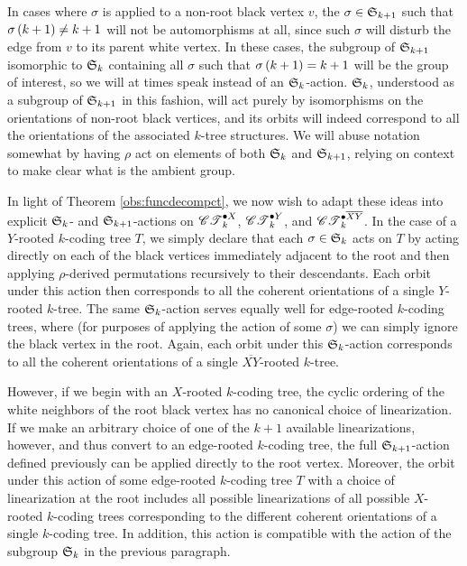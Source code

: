 \documentclass[sectionflow,singlespace,twoside,boldmathhdr,draft]{brandiss} %
\numberwithin{section}{chapter}
\numberwithin{figure}{chapter}
\begin{document}
In cases where $\sigma$ is applied to a non-root black vertex $v$, the $\sigma \in \symgp{k+1}$ such that $\sigma \pbrac{k+1} \neq k+1$ will not be automorphisms at all, since such $\sigma$ will disturb the edge from $v$ to its parent white vertex.
In these cases, the subgroup of $\symgp{k+1}$ isomorphic to $\symgp{k}$ containing all $\sigma$ such that $\sigma \pbrac{k+1} = k+1$ will be the group of interest, so we will at times speak instead of an $\symgp{k}$-action.
$\symgp{k}$, understood as a subgroup of $\symgp{k+1}$ in this fashion, will act purely by isomorphisms on the orientations of non-root black vertices, and its orbits will indeed correspond to all the orientations of the associated $k$-tree structures.
We will abuse notation somewhat by having $\rho$ act on elements of both $\symgp{k}$ and $\symgp{k+1}$, relying on context to make clear what is the ambient group.

In light of Theorem \ref{obs:funcdecompct}, we now wish to adapt these ideas into explicit $\symgp{k}$- and $\symgp{k+1}$-actions on $\pointed[X]{\specname{CT}}_{k}$, $\pointed[Y]{\specname{CT}}_{k}$, and $\pointed[\overline{XY}]{\specname{CT}}_{k}$.
In the case of a $Y$-rooted $k$-coding tree $T$, we simply declare that each $\sigma \in \symgp{k}$ acts on $T$ by acting directly on each of the black vertices immediately adjacent to the root and then applying $\rho$-derived permutations recursively to their descendants.
Each orbit under this action then corresponds to all the coherent orientations of a single $Y$-rooted $k$-tree.
The same $\symgp{k}$-action serves equally well for edge-rooted $k$-coding trees, where (for purposes of applying the action of some $\sigma$) we can simply ignore the black vertex in the root.
Again, each orbit under this $\symgp{k}$-action corresponds to all the coherent orientations of a single $\overline{XY}$-rooted $k$-tree.

However, if we begin with an $X$-rooted $k$-coding tree, the cyclic ordering of the white neighbors of the root black vertex has no canonical choice of linearization.
If we make an arbitrary choice of one of the $k+1$ available linearizations, however, and thus convert to an edge-rooted $k$-coding tree, the full $\symgp{k+1}$-action defined previously can be applied directly to the root vertex.
Moreover, the orbit under this action of some edge-rooted $k$-coding tree $T$ with a choice of linearization at the root includes all possible linearizations of all possible $X$-rooted $k$-coding trees corresponding to the different coherent orientations of a single $k$-coding tree.
In addition, this action is compatible with the action of the subgroup $\symgp{k}$ in the previous paragraph.
\end{document}
